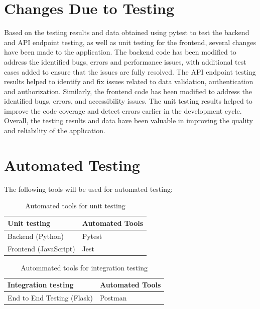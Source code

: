 \documentclass[12pt, titlepage]{article}
\begin{document}
\section{Changes Due to Testing}
Based on the testing results and data obtained using pytest to test the backend and API endpoint testing, as well as unit testing for the frontend, several changes have been made to the application. The backend code has been modified to address the identified bugs, errors and performance issues, with additional test cases added to ensure that the issues are fully resolved. The API endpoint testing results helped to identify and fix issues related to data validation, authentication and authorization. Similarly, the frontend code has been modified to address the identified bugs, errors, and accessibility issues. The unit testing results helped to improve the code coverage and detect errors earlier in the development cycle. Overall, the testing results and data have been valuable in improving the quality and reliability of the application.

\section{Automated Testing}
The following tools will be used for automated testing:

\begin{table}[ht!]
    \centering
    \begin{tabular}{p{}|p{}}
    \hline
        \textbf{Unit testing} & \textbf{Automated Tools} \\ \hline
        Backend (Python) & Pytest \\ \hline
        Frontend (JavaScript) & Jest \\ \hline
    \end{tabular}
    \caption{Automated tools for unit testing}
\end{table}

\begin{table}[!h]
    \centering
    \begin{tabular}{p{}|p{}}
    \hline
        \textbf{Integration testing} & \textbf{Automated Tools} \\ \hline
        End to End Testing (Flask) & Postman \\ \hline
    \end{tabular}
    \caption{Autommated tools for integration testing}
\end{table}
\end{document}
